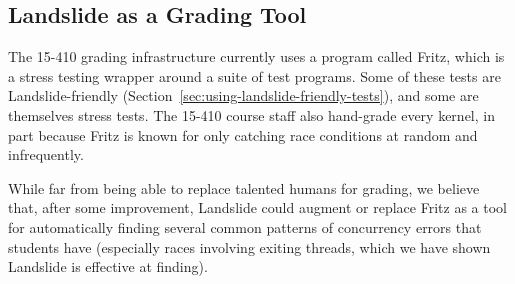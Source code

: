 \subsection{Landslide as a Grading Tool}

The 15-410 grading infrastructure currently uses a program called Fritz, which is a stress testing wrapper around a suite of test programs. Some of these tests are Landslide-friendly (Section~\ref{sec:using-landslide-friendly-tests}), and some are themselves stress tests. The 15-410 course staff also hand-grade every kernel, in part because Fritz is known for only catching race conditions at random and infrequently.

While far from being able to replace talented humans for grading, we believe that, after some improvement, Landslide could augment or replace Fritz as a tool for automatically finding several common patterns of concurrency errors that students have (especially races involving exiting threads, which we have shown Landslide is effective at finding).

